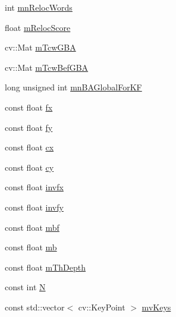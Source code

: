 \begin{DoxyCompactItemize}
\item 
int \mbox{\hyperlink{class_o_r_b___s_l_a_m2_1_1_key_frame_a0b1f8023efe8ddf58ac5d1d2cf41c0cf}{mn\+Reloc\+Words}}
\item 
float \mbox{\hyperlink{class_o_r_b___s_l_a_m2_1_1_key_frame_a78f768a3601ac95f99dff3fd511f2a6e}{m\+Reloc\+Score}}
\item 
cv\+::\+Mat \mbox{\hyperlink{class_o_r_b___s_l_a_m2_1_1_key_frame_ac9bdd885bb078b5e1910c2317e9aa112}{m\+Tcw\+G\+BA}}
\item 
cv\+::\+Mat \mbox{\hyperlink{class_o_r_b___s_l_a_m2_1_1_key_frame_a4a6fb84afa3701dcc6b1e3e76ccb36fa}{m\+Tcw\+Bef\+G\+BA}}
\item 
long unsigned int \mbox{\hyperlink{class_o_r_b___s_l_a_m2_1_1_key_frame_a31b686c81674d0248b5f7dabdfd58ecb}{mn\+B\+A\+Global\+For\+KF}}
\item 
const float \mbox{\hyperlink{class_o_r_b___s_l_a_m2_1_1_key_frame_a951e9ac5670b8543a7386dee5714da0c}{fx}}
\item 
const float \mbox{\hyperlink{class_o_r_b___s_l_a_m2_1_1_key_frame_ab1acd1b8dad098299d350f67dc4517c0}{fy}}
\item 
const float \mbox{\hyperlink{class_o_r_b___s_l_a_m2_1_1_key_frame_a70011d4f3a151dd374c684e258aab4a8}{cx}}
\item 
const float \mbox{\hyperlink{class_o_r_b___s_l_a_m2_1_1_key_frame_ae78735c57b92b2d5960ed21c97dfe6a8}{cy}}
\item 
const float \mbox{\hyperlink{class_o_r_b___s_l_a_m2_1_1_key_frame_a00ce06c4d206f7ddb1daeeb7c43eb074}{invfx}}
\item 
const float \mbox{\hyperlink{class_o_r_b___s_l_a_m2_1_1_key_frame_a7b96f772fad3b9b816dae9f8a719a15d}{invfy}}
\item 
const float \mbox{\hyperlink{class_o_r_b___s_l_a_m2_1_1_key_frame_a5653a9c7ccbb7703a131e0bff11c1f60}{mbf}}
\item 
const float \mbox{\hyperlink{class_o_r_b___s_l_a_m2_1_1_key_frame_a9ad155ef1d46eacccd088a55760926cf}{mb}}
\item 
const float \mbox{\hyperlink{class_o_r_b___s_l_a_m2_1_1_key_frame_a16a3c245370ba4efb5b473059c7f4362}{m\+Th\+Depth}}
\item 
const int \mbox{\hyperlink{class_o_r_b___s_l_a_m2_1_1_key_frame_ac9b6948404d0ade2779335708cd443b9}{N}}
\item 
const std\+::vector$<$ cv\+::\+Key\+Point $>$ \mbox{\hyperlink{class_o_r_b___s_l_a_m2_1_1_key_frame_aa1bcd5810e62ec163a3f38ccb806d04a}{mv\+Keys}}
\item 

\end{DoxyCompactItemize}
